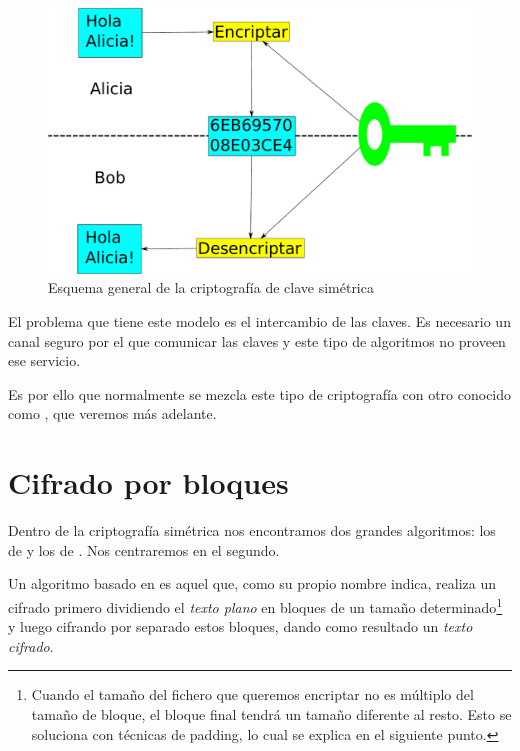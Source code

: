  \begin{figure}[ht]
   \centering
   \includegraphics[scale=0.4]{Figures/SymmetricKeyEncryption}
   \decoRule
   \caption[Criptografía de clave simétrica (Esquema)]{Esquema general de la criptografía de clave simétrica}
   \label{fig:SymmetricKeyEncryption}
 \end{figure}

 El problema que tiene este modelo es el intercambio de las claves.
 Es necesario un canal seguro por el que comunicar las claves y este tipo de algoritmos no proveen ese servicio. \emph{\parencite{Reference19}}

 Es por ello que normalmente se mezcla este tipo de criptografía con otro conocido como , que veremos más adelante.


 \section{Cifrado por bloques}

 Dentro de la criptografía simétrica nos encontramos dos grandes algoritmos: los de  y los de .
 Nos centraremos en el segundo.

 Un algoritmo basado en  es aquel que, como su propio nombre indica,
 realiza un cifrado primero dividiendo el \emph{texto plano} en bloques de un tamaño determinado\footnote{Cuando el tamaño del fichero que queremos encriptar no es múltiplo del tamaño de bloque, el bloque final tendrá un tamaño diferente al resto. Esto se soluciona con técnicas de padding, lo cual se explica en el siguiente punto.}
 y luego cifrando por separado estos bloques, dando como resultado un \emph{texto cifrado}.

